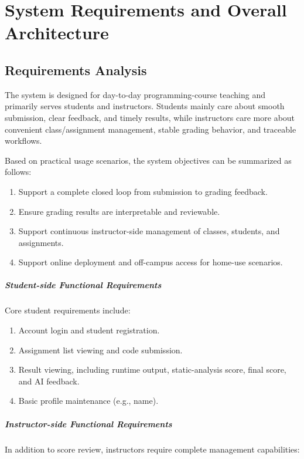 ﻿\chapter{System Requirements and Overall Architecture}


\section{Requirements Analysis}

The system is designed for day-to-day programming-course teaching and primarily serves students and instructors. Students mainly care about smooth submission, clear feedback, and timely results, while instructors care more about convenient class/assignment management, stable grading behavior, and traceable workflows.

Based on practical usage scenarios, the system objectives can be summarized as follows:

\begin{enumerate}
\item Support a complete closed loop from submission to grading feedback.
\item Ensure grading results are interpretable and reviewable.
\item Support continuous instructor-side management of classes, students, and assignments.
\item Support online deployment and off-campus access for home-use scenarios.
\end{enumerate}


\paragraph{Student-side Functional Requirements}
Core student requirements include:

\begin{enumerate}
\item Account login and student registration.
\item Assignment list viewing and code submission.
\item Result viewing, including runtime output, static-analysis score, final score, and AI feedback.
\item Basic profile maintenance (e.g., name).
\end{enumerate}


\paragraph{Instructor-side Functional Requirements}
In addition to score review, instructors require complete management capabilities:


